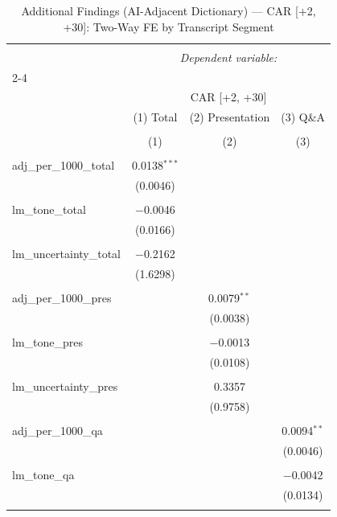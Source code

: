 
\begin{table}[!htbp] \centering 
  \caption{Additional Findings (AI-Adjacent Dictionary) — CAR [+2, +30]: Two-Way FE by Transcript Segment} 
  \label{} 
\begin{tabular}{@{\extracolsep{5pt}}lccc} 
\\[-1.8ex]\hline 
\hline \\[-1.8ex] 
 & \multicolumn{3}{c}{\textit{Dependent variable:}} \\ 
\cline{2-4} 
\\[-1.8ex] & \multicolumn{3}{c}{CAR [+2, +30]} \\ 
 & (1) Total & (2) Presentation & (3) Q\&A \\ 
\\[-1.8ex] & (1) & (2) & (3)\\ 
\hline \\[-1.8ex] 
 adj\_per\_1000\_total & 0.0138$^{***}$ &  &  \\ 
  & (0.0046) &  &  \\ 
  & & & \\ 
 lm\_tone\_total & $-$0.0046 &  &  \\ 
  & (0.0166) &  &  \\ 
  & & & \\ 
 lm\_uncertainty\_total & $-$0.2162 &  &  \\ 
  & (1.6298) &  &  \\ 
  & & & \\ 
 adj\_per\_1000\_pres &  & 0.0079$^{**}$ &  \\ 
  &  & (0.0038) &  \\ 
  & & & \\ 
 lm\_tone\_pres &  & $-$0.0013 &  \\ 
  &  & (0.0108) &  \\ 
  & & & \\ 
 lm\_uncertainty\_pres &  & 0.3357 &  \\ 
  &  & (0.9758) &  \\ 
  & & & \\ 
 adj\_per\_1000\_qa &  &  & 0.0094$^{**}$ \\ 
  &  &  & (0.0046) \\ 
  & & & \\ 
 lm\_tone\_qa &  &  & $-$0.0042 \\ 
  &  &  & (0.0134) \\ 
  & & & \\ 

\end{tabular}
\end{table}
